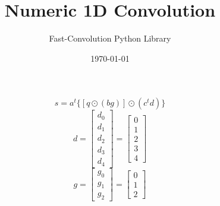 \documentclass{article}%
\title{Numeric 1D Convolution}%
\author{Fast{-}Convolution Python Library}%
\date{\today}%
\begin{document}
%
\normalsize%
\maketitle%
\[%
s = a^t \{[q \odot (bg)] \odot (c^t d)\}%
\]%
\[%
d = \left[\begin{matrix}d_{0}\\d_{1}\\d_{2}\\d_{3}\\d_{4}\end{matrix}\right] = \left[\begin{matrix}0\\1\\2\\3\\4\end{matrix}\right]%
\]%
\[%
g = \left[\begin{matrix}g_{0}\\g_{1}\\g_{2}\end{matrix}\right] = \left[\begin{matrix}0\\1\\2\end{matrix}\right]%
\]%
\end{document}
